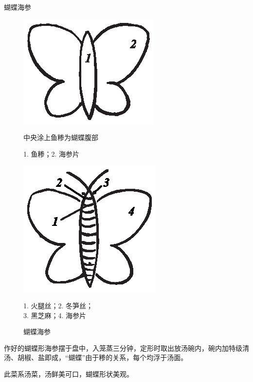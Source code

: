 \begin{recipe}{蝴蝶海参}
\begin{figure}[h]
\vspace{-.25\baselineskip}%
\parbox{14.75em}{%
        \vspace{-.1875\baselineskip}%
        \hspace{2em}\includegraphics[scale=1]{illustration-009.eps}%
        \vspace{-.4375\baselineskip}%
        \caption{中央涂上鱼糁为蝴蝶腹部}
		\label{crushed fish is used to make the body of butterfly}
        \begingroup%
        \small%
        \noindent%
        \null\hspace{4em}1. 鱼糁；2. 海参片
        \endgroup%
}%
\begin{minipage}{10.75em}
        \includegraphics[scale=1]{illustration-010.eps}%
        \caption{蝴蝶海参}
        \label{butterfly sea cucumber}
        \begingroup%
        \small%
        \noindent%
        \null\hspace{1.5em}1. 火腿丝；2. 冬笋丝；\\
        \null\hspace{1.5em}3. 黑芝麻；4. 海参片
        \endgroup%
\end{minipage}
\vspace{-.25\baselineskip}%
\end{figure}%

\step 作好的蝴蝶形海参摆于盘中，入笼蒸三分钟，定形时取出放汤碗内，碗内加特级清
汤、胡椒、盐即成，“蝴蝶”由于糁的关系，每个均浮于汤面。

\features

此菜系汤菜，汤鲜美可口，蝴蝶形状美观。

\end{recipe}

